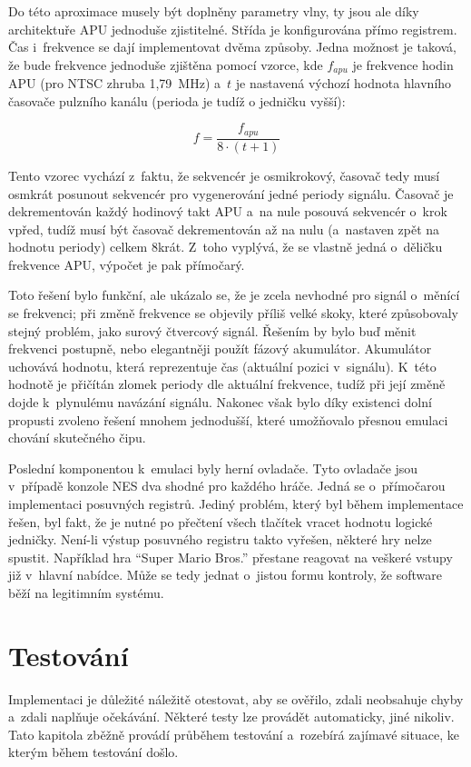 Do této aproximace musely být doplněny parametry vlny, ty jsou ale díky architektuře APU jednoduše zjistitelné. Střída je konfigurována přímo registrem. Čas i~frekvence se dají implementovat dvěma způsoby. Jedna možnost je taková, že bude frekvence jednoduše zjištěna pomocí vzorce, kde $f_{apu}$ je frekvence hodin APU (pro NTSC zhruba 1,79~MHz) a~$t$ je nastavená výchozí hodnota hlavního časovače pulzního kanálu (perioda je tudíž o jedničku vyšší):

\[
	f = \frac{f_{apu}}{8 \cdot (t + 1)}
\]

Tento vzorec vychází z~faktu, že sekvencér je osmikrokový, časovač tedy musí osmkrát posunout sekvencér pro vygenerování jedné periody signálu. Časovač je dekrementován každý hodinový takt APU a~na nule posouvá sekvencér o~krok vpřed, tudíž musí být časovač dekrementován až na nulu (a~nastaven zpět na hodnotu periody) celkem 8krát. Z~toho vyplývá, že se vlastně jedná o~děličku frekvence APU, výpočet je pak přímočarý.

Toto řešení bylo funkční, ale ukázalo se, že je zcela nevhodné pro signál o~měnící se frekvenci; při změně frekvence se objevily příliš velké skoky, které způsobovaly stejný problém, jako surový čtvercový signál. Řešením by bylo buď měnit frekvenci postupně, nebo elegantněji použít fázový akumulátor. Akumulátor uchovává hodnotu, která reprezentuje čas (aktuální pozici v~signálu). K~této hodnotě je přičítán zlomek periody dle aktuální frekvence, tudíž při její změně dojde k~plynulému navázání signálu. Nakonec však bylo díky existenci dolní propusti zvoleno řešení mnohem jednodušší, které umožňovalo přesnou emulaci chování skutečného čipu.

Poslední komponentou k~emulaci byly herní ovladače. Tyto ovladače jsou v~případě konzole NES dva shodné pro každého hráče. Jedná se o~přímočarou implementaci posuvných registrů. Jediný problém, který byl během implementace řešen, byl fakt, že je nutné po přečtení všech tlačítek vracet hodnotu logické jedničky. Není-li výstup posuvného registru takto vyřešen, některé hry nelze spustit. Například hra \enquote{Super Mario Bros.} přestane reagovat na veškeré vstupy již v~hlavní nabídce. Může se tedy jednat o~jistou formu kontroly, že software běží na legitimním systému.

\chapter{Testování}
Implementaci je důležité náležitě otestovat, aby se ověřilo, zdali neobsahuje chyby a~zdali naplňuje očekávání. Některé testy lze provádět automaticky, jiné nikoliv. Tato kapitola zběžně provádí průběhem testování a~rozebírá zajímavé situace, ke kterým během testování došlo.

